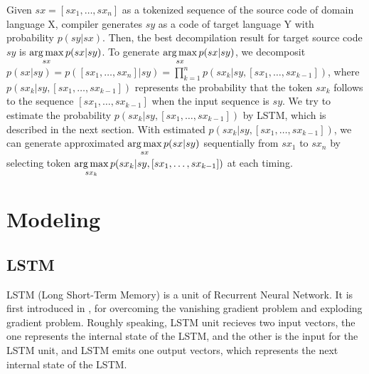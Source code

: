 \documentclass[senior,final,11pt]{iscs-thesis}
\newcommand{\argmax}{\mathop{\rm arg\,max}\limits}
\begin{document}
Given $sx = [sx_1, \dots, sx_n] $ as a tokenized sequence of the source code of domain language X, compiler generates $sy$ as a code of target language Y with probability $p(sy|sx)$.
Then, the best decompilation result for target source code $sy$ is $ \argmax_{sx} p(sx|sy)$. 
To generate $ \argmax_{sx} p(sx|sy)$, we decomposit $ p(sx|sy) = p([sx_1, \dots, sx_n] |sy) = \prod_{k=1}^{n} p(sx_k|sy,[sx_1,\dots,sx_{k-1}]) $,
where $ p(sx_k|sy,[sx_1,\dots,sx_{k-1}]) $ represents the probability that the token $ sx_k $ follows to the sequence $ [sx_1,\dots,sx_{k-1}] $ 
when the input sequence is $ sy $. 
We try to estimate the probability $ p(sx_k|sy,[sx_1,\dots,sx_{k-1}]) $ by LSTM, which is described in the next section.
With estimated $ p(sx_k|sy,[sx_1,\dots,sx_{k-1}]) $, we can generate approximated $ \argmax_{sx} p(sx|sy)$ sequentially from $sx_1$ to $sx_n$ by selecting token $ \argmax_{sx_{k}} p(sx_k|sy,[sx_1,\dots,sx_{k-1}]) $ at each timing.



\section{Modeling}

\subsection{LSTM}
LSTM (Long Short-Term Memory) is a unit of Recurrent Neural Network. 
It is first introduced in \cite{first_LSTM}, for overcoming the vanishing gradient problem and exploding gradient problem.
Roughly speaking, LSTM unit recieves two input vectors, 
the one represents the internal state of the LSTM, and the other is the input for the LSTM unit, 
and LSTM emits one output vectors, which represents the next internal state of the LSTM.
\end{document}

